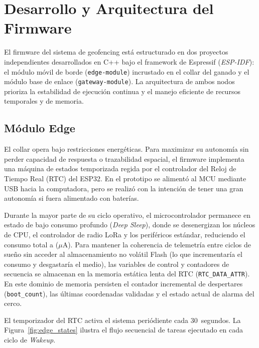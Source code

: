 \section{Desarrollo y Arquitectura del Firmware}

El firmware del sistema de geofencing está estructurado en dos proyectos independientes desarrollados en C++ bajo el framework de Espressif (\textit{ESP-IDF}): el módulo móvil de borde (\texttt{edge-module}) incrustado en el collar del ganado y el módulo base de enlace (\texttt{gateway-module}). La arquitectura de ambos nodos prioriza la estabilidad de ejecución continua y el manejo eficiente de recursos temporales y de memoria.

\subsection{Módulo Edge}

El collar opera bajo restricciones energéticas. Para maximizar su autonomía sin perder capacidad de respuesta o trazabilidad espacial, el firmware implementa una máquina de estados temporizada regida por el controlador del Reloj de Tiempo Real (RTC) del ESP32. En el prototipo se alimentó al MCU mediante USB hacia la computadora, pero se realizó con la intención de tener una gran autonomía si fuera alimentado con baterías.


Durante la mayor parte de su ciclo operativo, el microcontrolador permanece en estado de bajo consumo profundo (\textit{Deep Sleep}), donde se desenergizan los núcleos de CPU, el controlador de radio LoRa y los periféricos estándar, reduciendo el consumo total a ($\mu$A). Para mantener la coherencia de telemetría entre ciclos de sueño sin acceder al almacenamiento no volátil Flash (lo que incrementaría el consumo y desgastaría el medio), las variables de control y contadores de secuencia se almacenan en la memoria estática lenta del RTC (\texttt{RTC\_DATA\_ATTR}). En este dominio de memoria persisten el contador incremental de despertares (\texttt{boot\_count}), las últimas coordenadas validadas y el estado actual de alarma del cerco.


El temporizador del RTC activa el sistema periódiente cada 30~segundos. La Figura~\ref{fig:edge_states} ilustra el flujo secuencial de tareas ejecutado en cada ciclo de \textit{Wakeup}.

